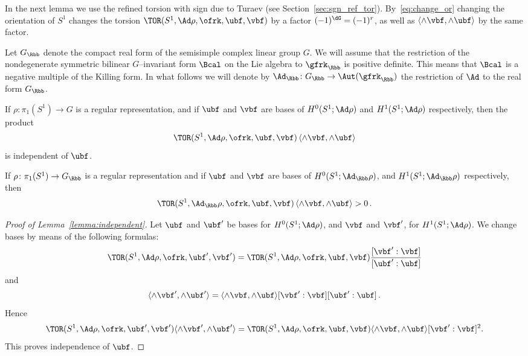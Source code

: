 In the next lemma we use the refined torsion with sign due to Turaev (see Section~\ref{sec:sgn_ref_tor}). By~\eqref{eq:change_or} changing the orientation of $S^1$ changes the torsion $\TOR(S^1,\Ad\rho,\ofrk,\linebreak\ubf,\vbf)$ by a factor $(-1)^{\dG}= (-1)^r$, as well as $\langle \wedge\vbf, \wedge\ubf \rangle$ by the same factor.


Let $G_\Rbb$ denote the compact real form of the semisimple complex linear group $G$. We will assume that the restriction of the nondegenerate symmetric bilinear $G$--invariant form $\Bcal$ on the Lie algebra to $\gfrk_\Rbb$ is positive definite. This means that $\Bcal$ is a negative multiple of the Killing form. In what follows we will denote by $\Ad_\Rbb\colon G_\Rbb\to \Aut(\gfrk_\Rbb)$ the restriction of $\Ad$ to the real form $G_\Rbb$.

\begin{lemm}\label{lemma:independent}
If $\rho\colon \pi_1(S^1)\to G$ is a regular representation, and if $\ubf$ and $\vbf$ are bases of $H^0(S^1;\Ad\rho)$ and $H^1(S^1;\Ad\rho)$ respectively, then the product
\[
\TOR(S^1,\Ad\rho,\ofrk, \ubf,\vbf)
\, \langle \wedge\vbf, \wedge\ubf \rangle
\]
is independent of $\ubf$.
\end{lemm}

\begin{lemm}\label{lemma:positive}
If $\rho\colon \pi_1(S^1)\to G_\Rbb$ is a regular representation and if $\ubf$ and $\vbf$ are bases of $H^0(S^1;\Ad_\Rbb\rho) $, and $H^1(S^1;\Ad_\Rbb\rho) $ respectively, then
\[
\TOR(S^1,\Ad_\Rbb\rho, \ofrk,\ubf,\vbf)
\, \langle \wedge\vbf, \wedge\ubf \rangle >0\,.
\]
\end{lemm}


\begin{proof}[Proof of Lemma~\ref{lemma:independent}] Let $\ubf$ and $\ubf'$ be bases for $H^0(S^1;\Ad\rho)$, and $\vbf$ and $\vbf'$, for $H^1(S^1;\Ad\rho)$.
We change bases by means of the following formulas:
\[
\TOR(S^1,\Ad\rho,\ofrk, \ubf',\vbf')=
\TOR(S^1,\Ad\rho, \ofrk, \ubf,\vbf)
\frac{[\vbf': \vbf]}{[\ubf': \ubf]}
\]
and
\[
\langle \wedge \vbf', \wedge \ubf' \rangle = \langle \wedge \vbf, \wedge \ubf \rangle {[\vbf': \vbf]}{[\ubf': \ubf]}\,.
\]
Hence
\begin{equation}\label{eqn:change}
\TOR(S^1,\Ad\rho, \ofrk, \ubf',\vbf') \langle \wedge \vbf', \wedge \ubf' \rangle =
\TOR(S^1,\Ad\rho, \ofrk, \ubf,\vbf) \langle \wedge \vbf, \wedge \ubf \rangle [\vbf': \vbf]^2.
\end{equation}
This proves independence of $\ubf$.
\end{proof}


